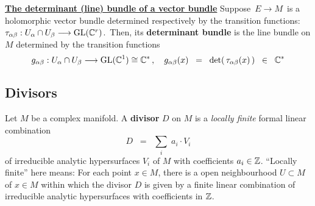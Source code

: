 \vskip 0.5cm
\noindent
\underline{\textbf{The determinant (line) bundle of a vector bundle}}
\vskip 0.1cm
\noindent
Suppose
\,$E \longrightarrow M$\,
is a holomorphic vector bundle
determined respectively by the transition functions:
\,$\tau_{\alpha\beta} : U_{\alpha} \cap U_{\beta} \longrightarrow \textnormal{GL}(\mathbb{C}^{r})$.\,
Then, its \textbf{determinant bundle} is the line bundle on $M$
determined by the transition functions
\begin{equation*}
g_{\alpha\beta} : U_{\alpha} \cap U_{\beta} \longrightarrow \textnormal{GL}(\mathbb{C}^{1}) \cong \mathbb{C}^{*}\,,
\quad
g_{\alpha\beta}(x)
\;\; = \;\;
	\det\!\left(\,\tau_{\alpha\beta}(x)\,\right)
\;\; \in \;\;
	\mathbb{C}^{*}
\end{equation*}


\subsection{Divisors}

Let $M$ be a complex manifold.
A \textbf{divisor} $D$ on $M$ is a \textit{locally finite} formal linear combination
\begin{equation*}
D
\;\; = \;\;
	\underset{i}{\sum}\;a_{i} \cdot V_{i}
\end{equation*}
of irreducible analytic hypersurfaces $V_{i}$ of $M$ with coefficients $a_{i} \in \mathbb{Z}$.
``Locally finite'' here means:
For each point $x \in M$, there is a open neighbourhood $U \subset M$ of $x \in M$ within which
the divisor $D$ is given by a finite linear combination of irreducible analytic hypersurfaces with coefficients in $\mathbb{Z}$.

